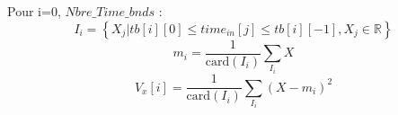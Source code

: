 Pour  i=$0$, $Nbre\_Time\_bnds$ :
\[
I_i = \left\{X_j | tb[i][0] \leq time_{in}[j] \le tb[i][-1],
 X_j \in \mathbb{R}\right\}
\]
\[
m_i = \frac{1}{\mathrm{card}(I_i)} \sum_{I_i} X
\]
\[
V_x[i] = \frac{1}{\mathrm{card}(I_i)} \sum_{I_i} (X -m_i)^2
\]
